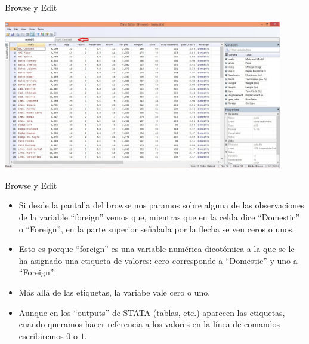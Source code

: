 \documentclass{beamer}
\begin{document}
\begin{frame}{Browse y Edit}
\centerline{\includegraphics[height=6.5cm]{browse.jpg}}
\end{frame}


\begin{frame}{Browse y Edit}
\begin{itemize}
\item Si desde la pantalla del browse nos paramos sobre alguna de las observaciones de la variable ``foreign'' vemos que, mientras que en la celda dice ``Domestic'' o ``Foreign'', en la parte superior señalada por la flecha se ven ceros o unos. 
\item Esto es porque ``foreign'' es una variable numérica dicotómica a la que se le ha asignado una etiqueta de valores: cero corresponde a ``Domestic'' y uno a ``Foreign''. 
\item Más allá de las etiquetas, la variabe vale cero o uno.
\item Aunque en los ``outputs'' de STATA (tablas, etc.) aparecen las etiquetas, cuando queramos hacer referencia a los valores en la línea de comandos escribiremos $0$ o $1$.
\end{itemize}
\end{frame}
\end{document}
